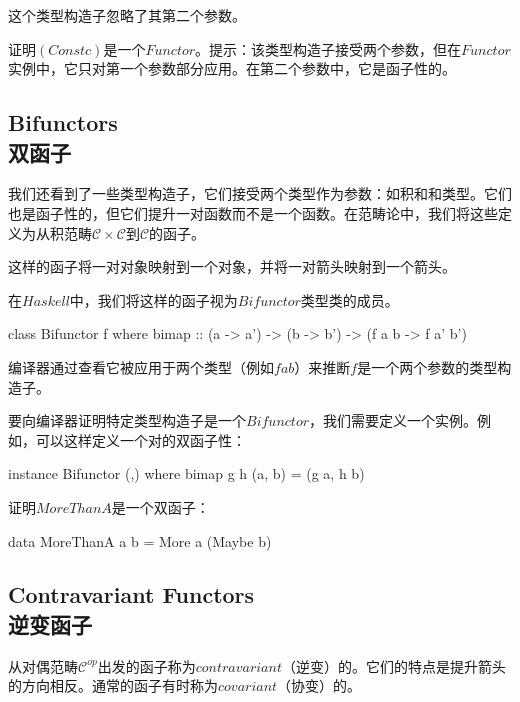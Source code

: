\documentclass[DaoFP]{subfiles}
\begin{document}
    这个类型构造子忽略了其第二个参数。

    \begin{exercise}
        证明$(Const c)$是一个$Functor$。提示：该类型构造子接受两个参数，但在$Functor$实例中，它只对第一个参数部分应用。在第二个参数中，它是函子性的。
    \end{exercise}

    \subsection{Bifunctors\\双函子}

    我们还看到了一些类型构造子，它们接受两个类型作为参数：如积和和类型。它们也是函子性的，但它们提升一对函数而不是一个函数。在范畴论中，我们将这些定义为从积范畴$\mathcal{C} \times \mathcal{C}$到$\mathcal{C}$的函子。

    这样的函子将一对对象映射到一个对象，并将一对箭头映射到一个箭头。

    在$Haskell$中，我们将这样的函子视为$Bifunctor$类型类的成员。

    \begin{haskell}
        class Bifunctor f where
        bimap :: (a -> a') -> (b -> b') -> (f a b -> f a' b')
    \end{haskell}

    编译器通过查看它被应用于两个类型（例如$f a b$）来推断$f$是一个两个参数的类型构造子。

    要向编译器证明特定类型构造子是一个$Bifunctor$，我们需要定义一个实例。例如，可以这样定义一个对的双函子性：

    \begin{haskell}
        instance Bifunctor (,) where
        bimap g h (a, b) = (g a, h b)
    \end{haskell}

    \begin{exercise}
        证明$MoreThanA$是一个双函子：
        \begin{haskell}
            data MoreThanA a b = More a (Maybe b)
        \end{haskell}
    \end{exercise}

    \subsection{Contravariant Functors\\逆变函子}

    从对偶范畴$\mathcal{C}^{op}$出发的函子称为$contravariant$（逆变）的。它们的特点是提升箭头的方向相反。通常的函子有时称为$covariant$（协变）的。
\end{document}
